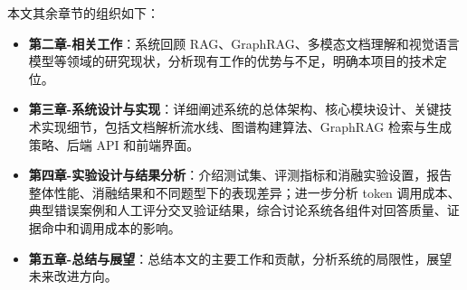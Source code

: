 本文其余章节的组织如下：

\begin{itemize}
\item \textbf{第二章-相关工作}：系统回顾 RAG、GraphRAG、多模态文档理解和视觉语言模型等领域的研究现状，分析现有工作的优势与不足，明确本项目的技术定位。
\item \textbf{第三章-系统设计与实现}：详细阐述系统的总体架构、核心模块设计、关键技术实现细节，包括文档解析流水线、图谱构建算法、GraphRAG 检索与生成策略、后端 API 和前端界面。
\item \textbf{第四章-实验设计与结果分析}：介绍测试集、评测指标和消融实验设置，报告整体性能、消融结果和不同题型下的表现差异；进一步分析 token 调用成本、典型错误案例和人工评分交叉验证结果，综合讨论系统各组件对回答质量、证据命中和调用成本的影响。
\item \textbf{第五章-总结与展望}：总结本文的主要工作和贡献，分析系统的局限性，展望未来改进方向。
\end{itemize}
